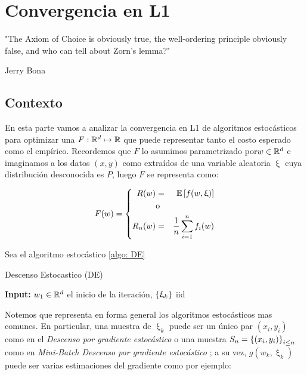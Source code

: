 \chapter{Convergencia en L1}\label{ch:convergenciaL1}

\epigraph{"The Axiom of Choice is obviously true, the well-ordering principle obviously false, and who can tell about Zorn's lemma?"}{Jerry Bona}

\section{Contexto}

En esta parte vamos a analizar la convergencia en L1 de algoritmos estoc\'asticos para optimizar una $F: {\mathbb{R}}^d \mapsto {\mathbb{R}}$ que puede representar tanto el costo esperado como el emp\'irico. Recordemos que $F$ lo asumimos parametrizado por$w \in {\mathbb{R}}^d$ e imaginamos a los datos $(x,y)$ como extra\'idos de una variable aleatoria $\upxi$ cuya distribuci\'on desconocida es $P$, luego $F$ se representa como:

\begin{equation}
F(w) = \left\lbrace
\begin{aligned}
R(w) & = & \mathbb{E} \left[f(w, \upxi)\right] \\
& \text{o} & \\
R_n(w) & = & \frac{1}{n} \sum\limits_{i=1}^{n} {f_i(w)}
\end{aligned}
\right.
\end{equation}

Sea el algoritmo estoc\'astico \ref{algo: DE}

\LinesNumbered
\begin{algorithm}[H]
	\caption{Descenso Estocastico (DE) \label{algo: DE}}
	\textbf{Input:} $w_1 \in {\mathbb{R}}^d$ el inicio de la iteraci\'on, $\left\lbrace\upxi_{k}\right\rbrace $ iid \\
\end{algorithm}

Notemos que representa en forma general los algoritmos estoc\'asticos mas comunes. En particular, una muestra de $\upxi_k$ puede ser un \'unico par $(x_i, y_i)$ como en el \textit{Descenso por gradiente estoc\'astico} o una muestra $S_n = \left\lbrace(x_i, y_i)\right\rbrace_{i \leq n}$ como en \textit{Mini-Batch Descenso por gradiente estoc\'astico} ; a su vez, $g(w_k, \upxi_k)$ puede ser varias estimaciones del gradiente como por ejemplo:

